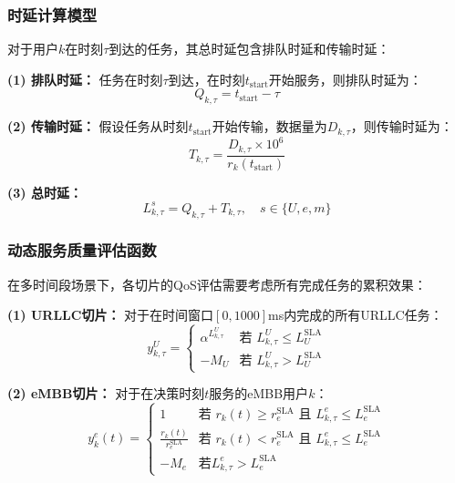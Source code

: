 \subsubsection{时延计算模型}

对于用户$k$在时刻$\tau$到达的任务，其总时延包含排队时延和传输时延：

\textbf{(1) 排队时延：}
任务在时刻$\tau$到达，在时刻$t_{\text{start}}$开始服务，则排队时延为：
\begin{equation}
Q_{k,\tau} = t_{\text{start}} - \tau
\end{equation}

\textbf{(2) 传输时延：}
假设任务从时刻$t_{\text{start}}$开始传输，数据量为$D_{k,\tau}$，则传输时延为：
\begin{equation}
T_{k,\tau} = \frac{D_{k,\tau} \times 10^6}{r_k(t_{\text{start}})}
\end{equation}

\textbf{(3) 总时延：}
\begin{equation}
L_{k,\tau}^s = Q_{k,\tau} + T_{k,\tau}, \quad s \in \{U, e, m\}
\end{equation}

\subsubsection{动态服务质量评估函数}

在多时间段场景下，各切片的QoS评估需要考虑所有完成任务的累积效果：

\textbf{(1) URLLC切片：}
对于在时间窗口$[0, 1000]$ms内完成的所有URLLC任务：
\begin{equation}
y_{k,\tau}^{U} = \begin{cases}
\alpha^{L_{k,\tau}^{U}} & \text{若 } L_{k,\tau}^{U} \leq L_{U}^{\text{SLA}} \\
-M_{U} & \text{若 } L_{k,\tau}^{U} > L_{U}^{\text{SLA}}
\end{cases}
\end{equation}

\textbf{(2) eMBB切片：}
对于在决策时刻$t$服务的eMBB用户$k$：
\begin{equation}
y_{k}^{e}(t) = \begin{cases}
1 & \text{若 } r_k(t) \geq r_{e}^{\text{SLA}} \text{ 且 } L_{k,\tau}^{e} \leq L_{e}^{\text{SLA}} \\
\frac{r_k(t)}{r_{e}^{\text{SLA}}} & \text{若 } r_k(t) < r_{e}^{\text{SLA}} \text{ 且 } L_{k,\tau}^{e} \leq L_{e}^{\text{SLA}} \\
-M_{e} & \text{若} L_{k,\tau}^{e} > L_{e}^{\text{SLA}}
\end{cases}
\end{equation}

